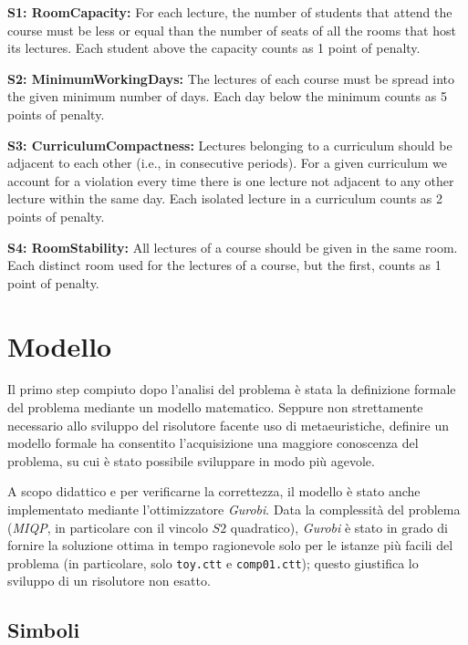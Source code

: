 \documentclass[]{article}
\begin{document}
\textbf{S1: RoomCapacity:} For each lecture, the number of students that attend the course must be
less or equal than the number of seats of all the rooms that host its lectures.
Each student above the capacity counts as 1 point of penalty.

\textbf{S2: MinimumWorkingDays:} The lectures of each course must be spread into the given 
minimum number of days. Each day below the minimum counts as 5 points of penalty.

\textbf{S3: CurriculumCompactness:} Lectures belonging to a curriculum should be adjacent to each
other (i.e., in consecutive periods). For a given curriculum we account for a violation
every time there is one lecture not adjacent to any other lecture within the same day.
Each isolated lecture in a curriculum counts as 2 points of penalty.

\textbf{S4: RoomStability:} All lectures of a course should be given in the same room. 
Each distinct room used for the lectures of a course, but the first, counts as 1 point of penalty.


\section{Modello}

Il primo step compiuto dopo l'analisi del problema è stata la definizione formale del problema mediante un modello matematico. Seppure non strettamente necessario allo sviluppo del risolutore facente uso di metaeuristiche, definire un modello formale ha consentito l'acquisizione una maggiore conoscenza del problema, su cui è stato possibile sviluppare in modo più agevole.

A scopo didattico e per verificarne la correttezza, il modello è stato anche implementato mediante l'ottimizzatore \textit{Gurobi}.
Data la complessità del problema (\textit{MIQP}, in particolare con il vincolo $S2$ quadratico), \textit{Gurobi} è stato in grado di fornire la soluzione ottima in tempo ragionevole solo per le istanze più facili del problema (in particolare, solo \texttt{toy.ctt}  e \texttt{comp01.ctt}); questo giustifica lo sviluppo di un risolutore non esatto.

\subsection{Simboli}
\end{document}
